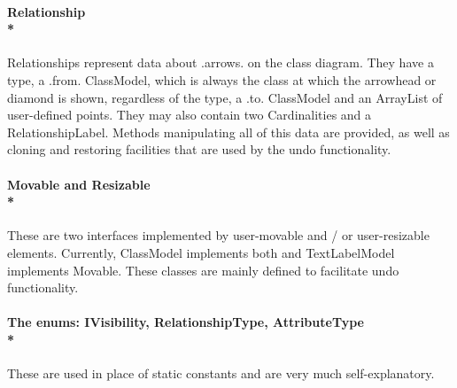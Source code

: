\paragraph{\small{\tab Relationship\\*}}

\hspace{-10px}Relationships represent data about .arrows. on the class diagram. They have a type, a .from. ClassModel, which is always the class at which the arrowhead or diamond is shown, regardless of the type, a .to. ClassModel and an ArrayList of user-defined points. They may also contain two Cardinalities and a RelationshipLabel. Methods manipulating all of this data are provided, as well as cloning and restoring facilities that are used by the undo functionality. 

\paragraph{\small{\tab Movable and Resizable\\*}}

\hspace{-10px} These are two interfaces implemented by user-movable and / or user-resizable elements. Currently, ClassModel implements both and TextLabelModel implements Movable. These classes are mainly defined to facilitate undo functionality.

\paragraph{\small{\tab The enums: IVisibility, RelationshipType, AttributeType\\*}}

\hspace{-10px}These are used in place of static constants and are very much self-explanatory.


